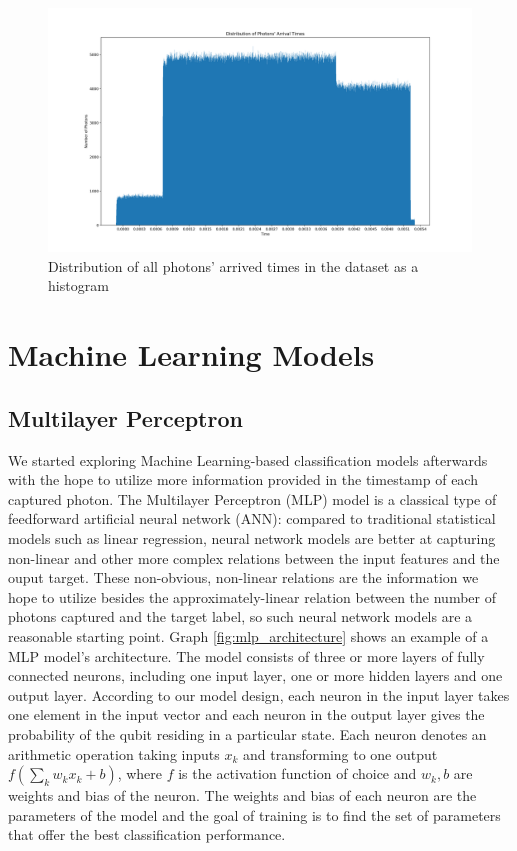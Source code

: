 \documentclass[letterpaper,twocolumn,10pt]{article}
\begin{document}
\begin{figure}
    \includegraphics[width=\linewidth]{Figures/distro_photons_arrival_times.png}
    \centering
    \caption{Distribution of all photons' arrived times in the dataset as a histogram}
    \label{fig:distro_photons_arrival_times}
\end{figure}

\section{Machine Learning Models}

\subsection{Multilayer Perceptron}

We started exploring Machine Learning-based classification models afterwards with the hope to utilize more information provided in the timestamp of each captured photon. The Multilayer Perceptron (MLP) model is a classical type of feedforward artificial neural network (ANN): compared to traditional statistical models such as linear regression, neural network models are better at capturing non-linear and other more complex relations between the input features and the ouput target. These non-obvious, non-linear relations are the information we hope to utilize besides the approximately-linear relation between the number of photons captured and the target label, so such neural network models are a reasonable starting point. Graph \ref{fig:mlp_architecture} shows an example of a MLP model's architecture. The model consists of three or more layers of fully connected neurons, including one input layer, one or more hidden layers and one output layer. According to our model design, each neuron in the input layer takes one element in the input vector and each neuron in the output layer gives the probability of the qubit residing in a particular state. Each neuron denotes an arithmetic operation taking inputs $x_k$ and transforming to one output $f(\sum_{k}{w_k}{x_k} + b)$, where $f$ is the activation function of choice and $w_k, b$ are weights and bias of the neuron. The weights and bias of each neuron are the parameters of the model and the goal of training is to find the set of parameters that offer the best classification performance.
\end{document}
